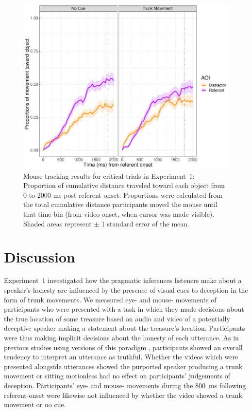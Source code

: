 \documentclass[a4paper,man,natbib]{apa6}
\begin{document}
\begin{figure}[Ht]
  \centering
	\includegraphics[width=\linewidth]{./img/e7_mouse_crit.pdf}
  \caption{Mouse-tracking results for critical trials in Experiment~1: Proportion of cumulative distance traveled toward each object from 0 to 2000 ms post-referent onset. Proportions were calculated from the total cumulative distance participants moved the mouse until that time bin (from video onset, when cursor was made visible). Shaded areas represent $\pm$ 1 standard error of the mean.}
  \label{fig:v1_mouse1}
\end{figure}

\section{Discussion}
Experiment~1 investigated how the pragmatic inferences listeners make about a speaker's honesty are influenced by the presence of visual cues to deception in the form of trunk movements.
We measured eye- and mouse- movements of participants who were presented with a task in which they made decisions about the true location of some treasure based on audio and video of a potentially deceptive speaker making a statement about the treasure's location.
Participants were thus making implicit decisions about the honesty of each utterance.
As in previous studies using versions of this paradigm \citep{Loy2017, King2018}, participants showed an overall tendency to interpret an utterance as truthful.
Whether the videos which were presented alongside utterances showed the purported speaker producing a trunk movement or sitting motionless had no effect on participants' judgements of deception.
Participants' eye- and mouse- movements during the 800~ms following referent-onset were likewise not influenced by whether the video showed a trunk movement or no cue.
\end{document}
